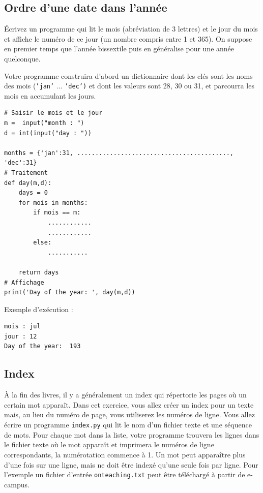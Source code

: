\documentclass[a4paper]{article}
\begin{document}
\subsection{Ordre d'une date dans l'année}
 Écrivez un programme qui lit le mois (abréviation de 3 lettres) et le jour du mois et affiche le numéro de ce jour (un nombre compris entre 1 et 365). On suppose en premier temps que l'année bissextile puis en généralise pour une année quelconque.

Votre programme construira d'abord un dictionnaire dont les clés sont les noms des mois ({\tt 'jan'} ... {\tt 'dec')} et dont les valeurs sont 28, 30 ou 31, et parcourra les mois en accumulant les jours.
\begin{lstlisting}
# Saisir le mois et le jour
m =  input("month : ") 
d = int(input("day : ")) 

months = {'jan':31, .........................................., 'dec':31}
# Traitement 
def day(m,d):
    days = 0
    for mois in months:
        if mois == m:
            ............
            ............
        else:
            ...........

    return days
# Affichage
print('Day of the year: ', day(m,d))
\end{lstlisting}
Exemple d'exécution :
\begin{verbatim}
mois : jul
jour : 12
Day of the year:  193
\end{verbatim}

\subsection{Index}
À la fin des livres, il y a généralement un index qui répertorie les pages où un certain mot apparaît. Dans cet
exercice, vous allez créer un index pour un texte mais, au lieu du numéro de page, vous utiliserez les numéros de ligne.
Vous allez écrire un programme {\tt index.py} qui lit le nom d'un fichier texte et une séquence de mots. Pour chaque mot dans la liste, votre programme trouvera les lignes dans le fichier texte où le mot apparaît et imprimera le numéros de ligne correspondants, la numérotation commence à 1. 
 Un mot peut apparaître plus d'une fois sur une ligne, mais ne doit être indexé qu'une seule fois par ligne.
Pour l'exemple un fichier d'entrée {\tt onteaching.txt}  peut être téléchargé à partir de e-campus.
\end{document}
